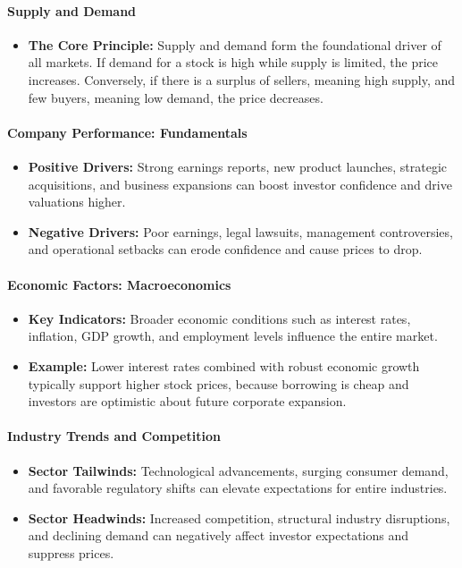 \documentclass[12pt,openany]{book}
\begin{document}
\paragraph{Supply and Demand}
\begin{itemize}[leftmargin=*]
    \item \textbf{The Core Principle:} Supply and demand form the foundational driver of all markets. If demand for a stock is high while supply is limited, the price increases. Conversely, if there is a surplus of sellers, meaning high supply, and few buyers, meaning low demand, the price decreases.
\end{itemize}

\paragraph{Company Performance: Fundamentals}
\begin{itemize}[leftmargin=*]
    \item \textbf{Positive Drivers:} Strong earnings reports, new product launches, strategic acquisitions, and business expansions can boost investor confidence and drive valuations higher.
    \item \textbf{Negative Drivers:} Poor earnings, legal lawsuits, management controversies, and operational setbacks can erode confidence and cause prices to drop.
\end{itemize}

\paragraph{Economic Factors: Macroeconomics}
\begin{itemize}[leftmargin=*]
    \item \textbf{Key Indicators:} Broader economic conditions such as interest rates, inflation, GDP growth, and employment levels influence the entire market.
    \item \textbf{Example:} Lower interest rates combined with robust economic growth typically support higher stock prices, because borrowing is cheap and investors are optimistic about future corporate expansion.
\end{itemize}

\paragraph{Industry Trends and Competition}
\begin{itemize}[leftmargin=*]
    \item \textbf{Sector Tailwinds:} Technological advancements, surging consumer demand, and favorable regulatory shifts can elevate expectations for entire industries.
    \item \textbf{Sector Headwinds:} Increased competition, structural industry disruptions, and declining demand can negatively affect investor expectations and suppress prices.
\end{itemize}
\end{document}
